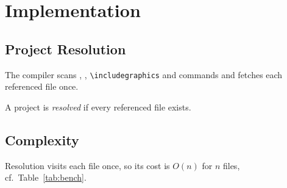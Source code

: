 \chapter{Implementation}\label{ch:impl}

\section{Project Resolution}
The compiler scans \verb||, \verb||, \verb|\includegraphics| and
\verb|| commands and fetches each referenced file once.

\begin{definition}
A project is \emph{resolved} if every referenced file exists.
\end{definition}

\section{Complexity}
Resolution visits each file once, so its cost is $O(n)$ for $n$ files, cf.\ Table~\ref{tab:bench}.


